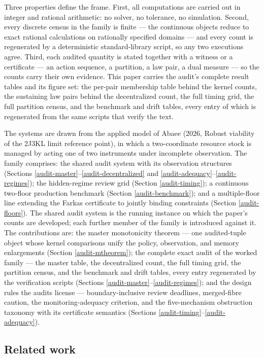\documentclass[10pt,twocolumn]{article}
\theoremstyle{plain}
\theoremstyle{definition}
\theoremstyle{remark}
\begin{document}
Three properties define the frame. First, all computations are carried
out in integer and rational arithmetic: no solver, no tolerance, no
simulation. Second, every discrete census in the family is finite --- the continuous objects reduce to exact rational calculations on rationally specified domains --- and every count is regenerated by a deterministic standard-library script, so any two executions agree. Third, each audited quantity is stated together with a
witness or a certificate --- an action sequence, a partition, a law
pair, a dual measure --- so the counts carry their own evidence. This paper carries the audit's complete result tables and its figure set:
the per-pair membership table behind the kernel counts, the sustaining
law pairs behind the decentralized count, the full timing grid, the full
partition census, and the benchmark and drift tables, every entry of
which is regenerated from the same scripts that verify the text.

The systems are drawn from the applied model of Abaee (2026, Robust viability of the 2J3KL limit reference point), in which
a two-coordinate resource stock is managed by acting one of two
instruments under incomplete observation. The family comprises: the
shared audit system with its observation structures (Sections
\ref{audit-master}--\ref{audit-decentralized} and \ref{audit-adequacy}--\ref{audit-regimes});
the hidden-regime review grid (Section
\ref{audit-timing}); a continuous two-floor production benchmark (Section
\ref{audit-benchmark}); and a multiple-floor line extending the Farkas
certificate to jointly binding constraints (Section \ref{audit-floors}). The
shared audit system is the running instance on which the paper's counts
are developed; each further member of the family is introduced against
it. The contributions are: the master monotonicity theorem --- one
audited-tuple object whose kernel comparisons unify the policy,
observation, and memory enlargements (Section \ref{audit-mtheorem}); the
complete exact audit of the worked family --- the master table, the
decentralized count, the full timing grid, the partition census, and the
benchmark and drift tables, every entry regenerated by the verification
scripts (Sections \ref{audit-master}--\ref{audit-regimes}); and the design rules
the audits license --- boundary-inclusive review deadlines,
merged-fibre caution, the monitoring-adequacy criterion, and the
five-mechanism obstruction taxonomy with its certificate semantics
(Sections \ref{audit-timing}--\ref{audit-adequacy}).

\subsection{Related work}
\label{audit-priorart}
\end{document}
